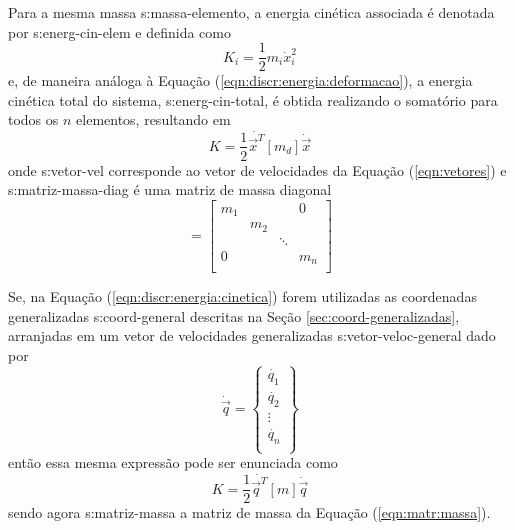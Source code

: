 \documentclass[12pt,openright,oneside,a4paper,
	chapter=TITLE,section=TITLE,
	english,brazil]{abntex2}
\begin{document}
	Para a mesma massa \gls{s:massa-elemento}, a energia cinética associada é denotada por \gls{s:energ-cin-elem} e definida como \cite{rao:2008}
	\begin{equation}
		K_i = \frac{1}{2}m_i\dot{x}_i^2
	\end{equation}
	e, de maneira análoga à Equação (\ref{eqn:discr:energia:deformacao}), a energia cinética total do sistema, \gls{s:energ-cin-total}, é obtida realizando o somatório para todos os $ n $ elementos, resultando em \cite{savi:2017}
	\begin{equation}\label{eqn:discr:energia:cinetica}
		K = \frac{1}{2}\dot{\vec{x}^T}[m_d]\dot{\vec{x}}
	\end{equation}
	onde \gls{s:vetor-vel} corresponde ao vetor de velocidades da Equação (\ref{eqn:vetores}) e \gls{s:matriz-massa-diag} é uma matriz de massa diagonal
	\begin{equation}
		[m_d] =
		\begin{bmatrix}
			m_1 & & & 0\\
			& m_2\\
			& & \ddots\\
			0 & & & m_n\\
		\end{bmatrix}
	\end{equation}
	
	Se, na Equação (\ref{eqn:discr:energia:cinetica}) forem utilizadas as coordenadas generalizadas \gls{s:coord-general} descritas na Seção \ref{sec:coord-generalizadas}, arranjadas em um vetor de velocidades generalizadas \gls{s:vetor-veloc-general} dado por
	\begin{equation}
		\dot{\vec{q}} = 
		\begin{Bmatrix}
			\dot{q_1}\\ \dot{q_2}\\ \vdots\\ \dot{q_n}\\
		\end{Bmatrix}
	\end{equation}
	então essa mesma expressão pode ser enunciada como \cite{rao:2008}
	\begin{equation}
		K = \frac{1}{2}\dot{\vec{q}^T}[m]\dot{\vec{q}}
	\end{equation}
	sendo agora \gls{s:matriz-massa} a matriz de massa da Equação (\ref{eqn:matr:massa}).
	
\end{document}
